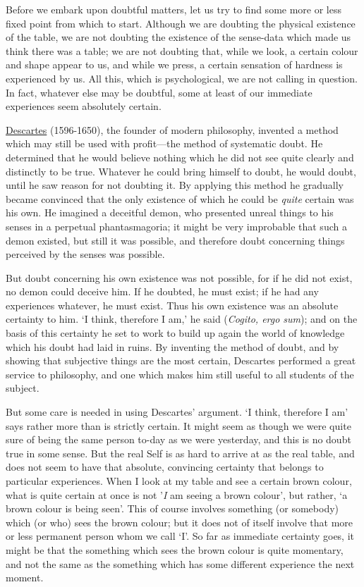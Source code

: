 \documentclass[oneside,letterpaper,12pt]{book}
\begin{document}
Before we embark upon doubtful matters, let us try to find some more or
less fixed point from which to start. Although we are doubting the
physical existence of the table, we are not doubting the existence of
the sense-data which made us think there was a table; we are not
doubting that, while we look, a certain colour and shape appear to us,
and while we press, a certain sensation of hardness is experienced by
us. All this, which is psychological, we are not calling in question. In
fact, whatever else may be doubtful, some at least of our immediate
experiences seem absolutely certain.

\href{https://plato.stanford.edu/entries/descartes/}{Descartes} (1596-1650), the founder of modern philosophy, invented a
method which may still be used with profit---the method of systematic
doubt. \label{doubt} He determined that he would believe nothing which he did not see
quite clearly and distinctly to be true. Whatever he could bring himself
to doubt, he would doubt, until he saw reason for not doubting it. By
applying this method he gradually became convinced that the only
existence of which he could be \emph{quite} certain was his own. He
imagined a deceitful demon, who presented unreal things to his senses in
a perpetual phantasmagoria; it might be very improbable that such a
demon existed, but still it was possible, and therefore doubt concerning
things perceived by the senses was possible.

But doubt concerning his own existence was not possible, for if he did
not exist, no demon could deceive him. If he doubted, he must exist; if
he had any experiences whatever, he must exist. Thus his own existence
was an absolute certainty to him. `I think, therefore I
am,' he said (\emph{Cogito, ergo sum}); and on the
basis of this certainty he set to work to build up again the world of
knowledge which his doubt had laid in ruins. By inventing the method of
doubt, and by showing that subjective things are the most certain,
Descartes performed a great service to philosophy, and one which makes
him still useful to all students of the subject.

But some care is needed in using Descartes' argument.
`I think, therefore I am' says rather
more than is strictly certain. It might seem as though we were quite
sure of being the same person to-day as we were yesterday, and this is
no doubt true in some sense. But the real Self is as hard to arrive at
as the real table, and does not seem to have that absolute, convincing
certainty that belongs to particular experiences. \label{self} When I look at my
table and see a certain brown colour, what is quite certain at once is
not '\emph{I} am seeing a brown colour',
but rather, `a brown colour is being
seen'. This of course involves something (or somebody)
which (or who) sees the brown colour; but it does not of itself involve
that more or less permanent person whom we call
`I'. So far as immediate certainty goes,
it might be that the something which sees the brown colour is quite
momentary, and not the same as the something which has some different
experience the next moment.
\end{document}
